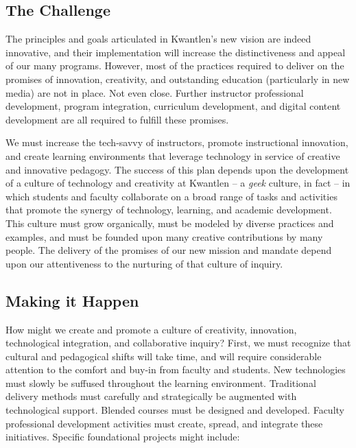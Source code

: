 \documentclass[10pt, letterpaper]{article}
\begin{document}
\subsection*{The Challenge}

The principles and goals articulated in Kwantlen's new vision are indeed innovative, and their implementation will increase the distinctiveness and appeal of our many programs. However, most of the practices required to deliver on the promises of innovation, creativity, and outstanding education (particularly in new media) are not in place. Not even close. Further instructor professional development, program integration, curriculum development, and digital content development are all required to fulfill these promises.

We must increase the tech-savvy of instructors, promote instructional innovation, and create learning environments that leverage technology in service of creative and innovative pedagogy. The success of this plan depends upon the development of a culture of technology and creativity at Kwantlen -- a \textit{geek} culture, in fact -- in which students and faculty collaborate on a broad range of tasks and activities that promote the synergy of technology, learning, and academic development. This culture must grow organically, must be modeled by diverse practices and examples, and must be founded upon many creative contributions by many people. The delivery of the promises of our new mission and mandate depend upon our attentiveness to the nurturing of that culture of inquiry.

\subsection*{Making it Happen}

How might we create and promote a culture of creativity, innovation, technological integration, and collaborative inquiry? First, we must recognize that cultural and pedagogical shifts will take time, and will require considerable attention to the comfort and buy-in from faculty and students. New technologies must slowly be suffused throughout the learning environment. Traditional delivery methods must carefully and strategically be augmented with technological support. Blended courses must be designed and developed. Faculty  professional development activities must create, spread, and integrate these initiatives. Specific foundational projects might include: 
\end{document}
